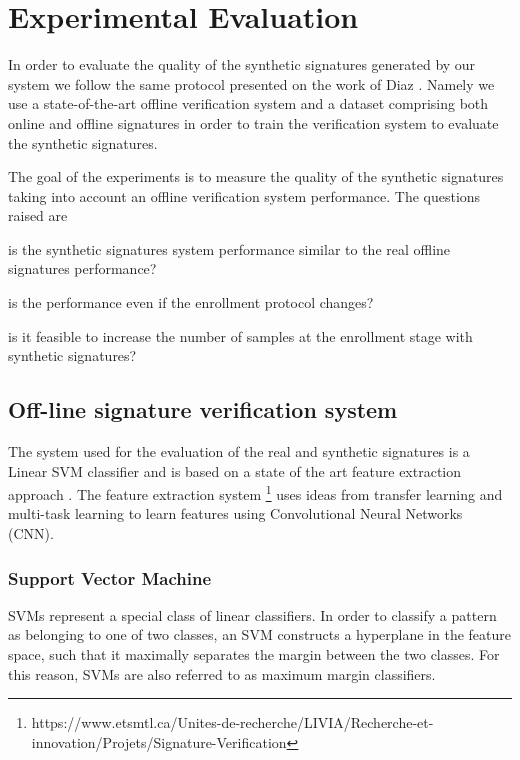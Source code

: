 
\chapter{Experimental Evaluation}\label{ch:exp}

In order to evaluate the quality of the synthetic signatures generated by our system we follow the same protocol presented on the work of Diaz \cite{diaz2014generation}. Namely we use a state-of-the-art offline verification system and a dataset comprising both online and offline signatures in order to train the verification system to evaluate the synthetic signatures.

The goal of the experiments is to measure the quality of the synthetic signatures taking into account an offline verification system performance. The questions raised are \begin{inlinelist}
  \item is the synthetic signatures system performance similar to the real offline signatures performance?
  \item is the performance even if the enrollment protocol changes?
  \item is it feasible to increase the number of samples at the enrollment stage with synthetic signatures? 
\end{inlinelist}



\section{Off-line signature verification system}
The system used for the evaluation of the real and synthetic signatures is a Linear SVM classifier and is based on a state of the art feature extraction approach  \cite{hafemann2017learning}. The feature extraction system \footnote{https://www.etsmtl.ca/Unites-de-recherche/LIVIA/Recherche-et-innovation/Projets/Signature-Verification} uses ideas from transfer learning and multi-task learning to learn features using Convolutional Neural Networks (CNN).

\subsection {Support Vector Machine} 
SVMs represent a special class of linear classifiers. In order to classify a pattern as
belonging to one of two classes, an SVM constructs a hyperplane in the feature space,
such that it maximally separates the margin between the two classes. For this reason,
SVMs are also referred to as maximum margin classifiers.


